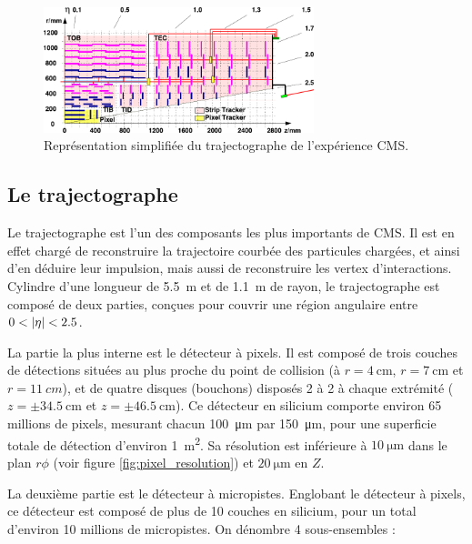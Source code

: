 \begin{figure}[t] \centering
  \includegraphics[width=0.7\textwidth]{chapitre2/figs/tracker.pdf}
  \caption{Représentation simplifiée du trajectographe de l'expérience CMS.}
  \label{fig:tracker}
\end{figure}

\subsection{Le trajectographe}

Le trajectographe est l'un des composants les plus importants de CMS. Il est en effet chargé de reconstruire la trajectoire courbée des particules chargées, et ainsi d'en déduire leur impulsion, mais aussi de reconstruire les vertex d'interactions. Cylindre d'une longueur de \SI{5.5}{\m} et de \SI{1.1}{\m} de rayon, le trajectographe est composé de deux parties, conçues pour couvrir une région angulaire entre $0 < \lvert \eta \rvert < \num{2.5}$.

\smallskip

La partie la plus interne est le détecteur à pixels. Il est composé de trois couches de détections situées au plus proche du point de collision (à $r = \SI{4}{\cm}$, $r = \SI{7}{\cm}$ et $r = \SI{11}{cm}$), et de quatre disques (bouchons) disposés 2 à 2 à chaque extrémité ($z = \pm \SI{34.5}{\cm}$ et $z = \pm \SI{46.5}{\cm}$). Ce détecteur en silicium comporte environ 65 millions de pixels, mesurant chacun \SI{100}{\um} par \SI{150}{\um}, pour une superficie totale de détection d'environ \SI{1}{\square\m}. Sa résolution est inférieure à $\SI{10}{\um}$ dans le plan $r\phi$ (voir figure \ref{fig:pixel_resolution}) et $\SI{20}{\um}$ en $Z$.

La deuxième partie est le détecteur à micropistes. Englobant le détecteur à pixels, ce détecteur est composé de plus de 10 couches en silicium, pour un total d'environ 10 millions de micropistes. On dénombre 4 sous-ensembles :

